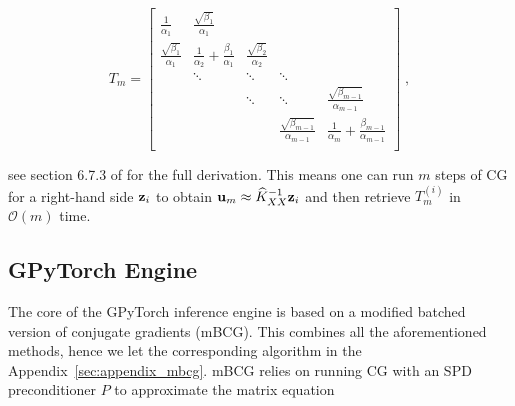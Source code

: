 \documentclass{article}
\begin{document}
\begin{equation} \label{eq:tridiag_lanczos_from_cg}
    T_m = \begin{bmatrix}
    \frac{1}{\alpha_1}              & \frac{\sqrt{\beta_1}}{\alpha_1}               &                                          & \\
    \frac{\sqrt{\beta_1}}{\alpha_1} & \frac{1}{\alpha_2} + \frac{\beta_1}{\alpha_1} & \frac{\sqrt{\beta_2}}{\alpha_2} & \\
                                    & \ddots                                        & \ddots
                                    & \ddots        & \\
                                    &               & \ddots                        & \ddots
                                    &  \frac{\sqrt{\beta_{m-1}}}{\alpha_{m-1}} \\
                                    &               &                               &       
                                    \frac{\sqrt{\beta_{m-1}}}{\alpha_{m-1}} & \frac{1}{\alpha_m} + \frac{\beta_{m-1}}{\alpha_{m-1}}\\
                                    
    \end{bmatrix}
    \; ,
\end{equation}

see section 6.7.3 of \cite{saad_iterative_2003} for the full derivation. This means one can run $m$ steps of CG for a right-hand side $\boldsymbol{\mathbf{z}}_i$ to obtain $\boldsymbol{\mathbf{u}}_m \approx \widehat K_{XX}^{-1} \boldsymbol{\mathbf{z}}_i$ and then retrieve $T_m^{(i)}$ in $\mathcal O(m)$ time. 


\subsection{GPyTorch Engine} \label{sec:gpytorch}

The core of the GPyTorch inference engine \cite{gardner_gpytorch_2021} is based on a modified batched version of conjugate gradients (mBCG). This combines all the aforementioned methods, hence we let the corresponding algorithm in the Appendix~\ref{sec:appendix_mbcg}. mBCG relies on running CG with an SPD preconditioner $P$ to approximate the matrix equation
\end{document}
